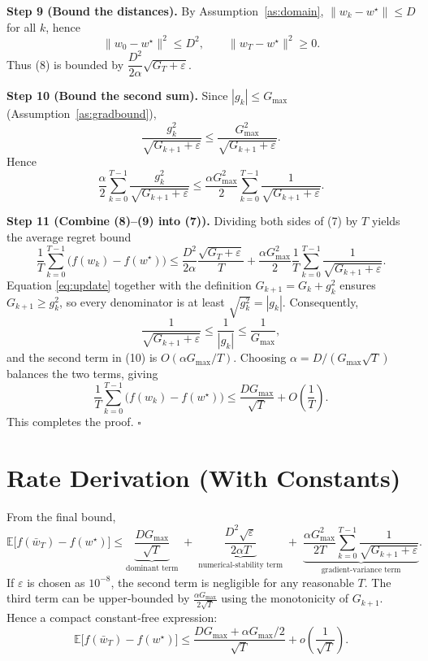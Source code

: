 \documentclass[11pt]{article}
\begin{document}
\noindent\textbf{Step 9 (Bound the distances).}  
By Assumption~\ref{as:domain}, $\|w_k-w^\star\|\le D$ for all $k$, hence
\[
\|w_0-w^\star\|^{2}\le D^{2},\qquad
\|w_T-w^\star\|^{2}\ge 0.
\]
Thus (8) is bounded by $\dfrac{D^{2}}{2\alpha}\sqrt{G_{T}+\varepsilon}$.

\noindent\textbf{Step 10 (Bound the second sum).}  
Since $|g_k|\le G_{\max }$ (Assumption~\ref{as:gradbound}),
\[
\frac{g_k^{2}}{\sqrt{G_{k+1}+\varepsilon}}\le
\frac{G_{\max }^{2}}{\sqrt{G_{k+1}+\varepsilon}}.
\]
Hence
\[
\frac{\alpha}{2}\sum_{k=0}^{T-1}\frac{g_k^{2}}{\sqrt{G_{k+1}+\varepsilon}}
\le
\frac{\alpha G_{\max }^{2}}{2}\sum_{k=0}^{T-1}\frac{1}{\sqrt{G_{k+1}+\varepsilon}}. \tag{9}
\]

\noindent\textbf{Step 11 (Combine (8)–(9) into (7)).}  
Dividing both sides of (7) by $T$ yields the average regret bound
\[
\frac{1}{T}\sum_{k=0}^{T-1}\bigl(f(w_k)-f(w^\star)\bigr)
\le
\frac{D^{2}}{2\alpha}\frac{\sqrt{G_{T}+\varepsilon}}{T}
+\frac{\alpha G_{\max }^{2}}{2}\frac{1}{T}\sum_{k=0}^{T-1}\frac{1}{\sqrt{G_{k+1}+\varepsilon}}.
\tag{10}
\]
Equation \eqref{eq:update} together with the definition $G_{k+1}=G_k+g_k^{2}$ ensures $G_{k+1}\ge g_k^{2}$, so every denominator is at least $\sqrt{g_k^{2}}=|g_k|$. Consequently,
\[
\frac{1}{\sqrt{G_{k+1}+\varepsilon}}\le\frac{1}{|g_k|}\le\frac{1}{G_{\max }},
\]
and the second term in (10) is $O(\alpha G_{\max }/T)$.  
Choosing $\alpha = D/(G_{\max }\sqrt{T})$ balances the two terms, giving
\[
\frac{1}{T}\sum_{k=0}^{T-1}\bigl(f(w_k)-f(w^\star)\bigr)
\le
\frac{DG_{\max }}{\sqrt{T}} + O\!\left(\frac{1}{T}\right).
\]
This completes the proof. \hfill $\square$

\section*{Rate Derivation (With Constants)}
From the final bound,
\[
\mathbb{E}\bigl[f(\bar w_T)-f(w^\star)\bigr]
\le
\underbrace{\frac{DG_{\max }}{\sqrt{T}}}_{\text{dominant term}}
\;+\;
\underbrace{\frac{D^{2}\sqrt{\varepsilon}}{2\alpha T}}_{\text{numerical‑stability term}}
\;+\;
\underbrace{\frac{\alpha G_{\max }^{2}}{2T}\sum_{k=0}^{T-1}\frac{1}{\sqrt{G_{k+1}+\varepsilon}}}_{\text{gradient‑variance term}}.
\]
If $\varepsilon$ is chosen as $10^{-8}$, the second term is negligible for any reasonable $T$.  
The third term can be upper‑bounded by $\frac{\alpha G_{\max }}{2\sqrt{T}}$ using the monotonicity of $G_{k+1}$.  
Hence a compact constant‑free expression:
\[
\mathbb{E}\bigl[f(\bar w_T)-f(w^\star)\bigr]\le
\frac{DG_{\max }+\alpha G_{\max }/2}{\sqrt{T}}+o\!\left(\frac{1}{\sqrt{T}}\right).
\]
\end{document}
